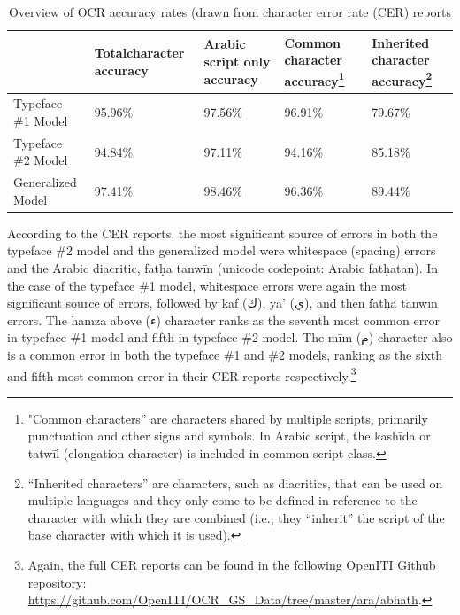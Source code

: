 \begin{table}[h!]
\centering
\begin{minipage}{\textwidth}
\caption{Overview of OCR accuracy rates (drawn from character error rate (CER) reports}
\label{tab_champs:table_2}
\renewcommand\footnoterule{}
\begin{tabularx}{\textwidth}{lp{2cm}p{2cm}p{2cm}p{2cm}} \toprule
	& \textbf{Total\newline character accuracy} & \textbf{Arabic script only accuracy} & \textbf{Common character accuracy}\footnote{"Common characters” are characters shared by multiple scripts, primarily punctuation and other signs and symbols. In Arabic script,
	the kashīda or tatwīl (elongation character) is included in common script class.} & \textbf{Inherited character accuracy}\footnote{“Inherited characters” are characters, such as diacritics, that can be used on multiple languages and they only come to be defined in reference to the character with which they are combined (i.e., they “inherit” the script of the base character with which it is used).}\\\midrule
Typeface \#1 Model & 95.96\% & 97.56\% & 96.91\% & 79.67\%\\ 
Typeface \#2 Model & 94.84\% & 97.11\% & 94.16\% & 85.18\% \\
Generalized Model & 97.41\% & 98.46\% & 96.36\% & 89.44\%\\
\bottomrule
\end{tabularx}
\end{minipage}
\end{table}

\label{s:whitespace}
According to the CER reports, the most significant source of errors in both the
typeface \#2 model and the generalized model were whitespace (spacing) errors
and the Arabic diacritic, fatḥa tanwīn (unicode codepoint: Arabic fatḥatan). In
the case of the typeface \#1 model, whitespace errors were again the most
significant source of errors, followed by kāf (\textarabic{ك}), yā’ (\textarabic{ي}), and then fatḥa
tanwīn errors. The hamza above (\textarabic{ء}) character ranks as the seventh most common
error in typeface \#1 model and fifth in typeface \#2 model. The mīm (\textarabic{م})
character also is a common error in both the typeface \#1 and \#2 models, ranking
as the sixth and fifth most common error in their CER reports
respectively.\footnote{ Again, the full CER reports can be found in the
following OpenITI Github repository:
\url{https://github.com/OpenITI/OCR_GS_Data/tree/master/ara/abhath}.}

